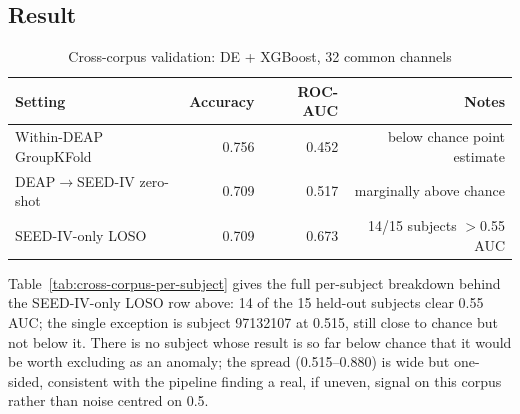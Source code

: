 \documentclass[11pt]{report}
\begin{document}
\subsection{Result}
\begin{table}[h]
\centering
\caption{Cross-corpus validation: DE + XGBoost, 32 common channels}
\label{tab:cross-corpus}
\begin{tabular}{lrrr}
\toprule
Setting & Accuracy & ROC-AUC & Notes \\
\midrule
Within-DEAP GroupKFold      & 0.756 & 0.452 & below chance point estimate \\
DEAP$\to$SEED-IV zero-shot  & 0.709 & 0.517 & marginally above chance \\
SEED-IV-only LOSO           & 0.709 & 0.673 & 14/15 subjects $>$0.55 AUC \\
\bottomrule
\end{tabular}
\end{table}

Table~\ref{tab:cross-corpus-per-subject} gives the full per-subject breakdown
behind the SEED-IV-only LOSO row above: 14 of the 15 held-out subjects clear
0.55 AUC; the single exception is subject 97132107 at 0.515, still close to
chance but not below it. There is no subject whose result is so far below
chance that it would be worth excluding as an anomaly; the spread
(0.515--0.880) is wide but one-sided, consistent with the pipeline finding a
real, if uneven, signal on this corpus rather than noise centred on 0.5.
\end{document}
